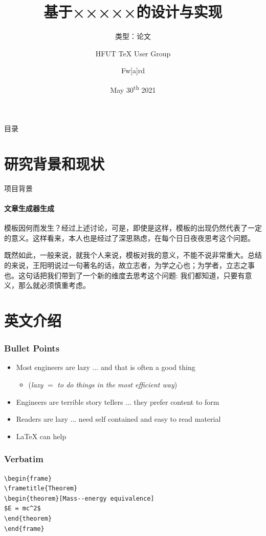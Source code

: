 \documentclass[aspectratio=169]{beamer}
\title{基于×××××的设计与实现}
\subtitle{类型：论文}
\author[{Fw[a]rd}]{HFUT \TeX{} User Group \and Fw[a]rd}
\institute{HFUT \TeX{} User Group}
\date{May 30\textsuperscript{th} 2021}
\begin{document}
\begin{frame}
	\maketitle
\end{frame}

\begin{frame}{目录}
	\tableofcontents
\end{frame}

\section{研究背景和现状}

\begin{frame}{项目背景}
    \framesubtitle{文章生成器生成}
{
    \setlength{\parskip}{6pt}
    \setlength{\parindent}{2em}
模板因何而发生？经过上述讨论，可是，即使是这样，模板的出现仍然代表了一定的意义。这样看来，本人也是经过了深思熟虑，在每个日日夜夜思考这个问题。

既然如此，一般来说，就我个人来说，模板对我的意义，不能不说非常重大。总结的来说，王阳明说过一句著名的话，故立志者，为学之心也；为学者，立志之事也。这句话把我们带到了一个新的维度去思考这个问题: 我们都知道，只要有意义，那么就必须慎重考虑。 
}
\end{frame}

\section{英文介绍}
\begin{frame}
\frametitle{Bullet Points}
\vspace{-0.3cm}
\begin{itemize}[<+->]
	\item Most engineers are lazy ... and that is often a good thing
	\begin{itemize}[<+->]
		\item (\textit{lazy} $=$ \textit{to do things in the most efficient way})
	\end{itemize}
	\item Engineers are terrible story tellers ... they prefer content to form
	\item Readers are lazy ... need self contained and easy to read material
	\item \LaTeX{} can help
\end{itemize}
\end{frame}

\begin{frame}[fragile] %
\frametitle{Verbatim}
\begin{example}
\begin{verbatim}
\begin{frame}
\frametitle{Theorem}
\begin{theorem}[Mass--energy equivalence]
$E = mc^2$
\end{theorem}
\end{frame}\end{verbatim}
\end{example}
\end{frame}
\end{document}
